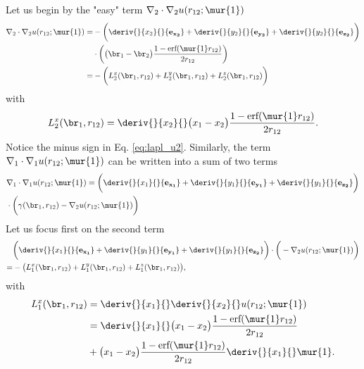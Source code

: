 Let us begin by the "easy" term $\nabla_2 \cdot \nabla_2 u(r_{12};\mur{1})$
\begin{equation}
 \begin{aligned}
 \label{eq:lapl_u2}
 \nabla_2 \cdot \nabla_2 u(r_{12};\mur{1}) =& -\bigg( \deriv{}{x_2}{} {\bf e_{x_2}}+ \deriv{}{y_2}{} {\bf e_{y_2}}+ \deriv{}{y_2}{} {\bf e_{z_2}} \bigg) \\ & \cdot \bigg(\big(\br_1 - \br_2 \big)\frac{1 - \text{erf}(\mur{1} r_{12})}{2 r_{12}}\bigg) \\
          =&-\bigg( L_2^x(\br_1, r_{12}) + L_2^y(\br_1, r_{12})  + L_2^z(\br_1, r_{12})\bigg)
 \end{aligned}
\end{equation}
with 
\begin{equation}
 L_2^x(\br_1, r_{12}) = \deriv{}{x_2}{} \big(x_1 - x_2 \big)\frac{1 - \text{erf}(\mur{1} r_{12})}{2 r_{12}}.
\end{equation}
Notice the minus sign in Eq. \eqref{eq:lapl_u2}. 
Similarly, the term $\nabla_1 \cdot \nabla_1 u(r_{12};\mur{1})$ can be written into a sum of two terms 
\begin{equation}
 \begin{aligned}
 &\nabla_1 \cdot \nabla_1 u(r_{12};\mur{1}) =  \bigg( \deriv{}{x_1}{} {\bf e_{x_1}}+ \deriv{}{y_1}{} {\bf e_{y_1}}+ \deriv{}{y_1}{} {\bf e_{z_2}} \bigg) \\ & \cdot \bigg( {\bf {\gamma}}(\br_1, r_{12}) - \nabla_2 u(r_{12};\mur{1}) \bigg) \\
 \end{aligned}
\end{equation}
Let us focus first on the second term 
\begin{equation}
 \begin{aligned}
 &\bigg( \deriv{}{x_1}{} {\bf e_{x_1}}+ \deriv{}{y_1}{} {\bf e_{y_1}}+ \deriv{}{y_1}{} {\bf e_{z_2}} \bigg)  \cdot \bigg( -\nabla_2 u(r_{12};\mur{1}) \bigg) \\
         = &  -\big(L_1^x(\br_1, r_{12}) + L_1^y(\br_1, r_{12})  + L_1^z(\br_1, r_{12}) \big) ,
 \end{aligned}
\end{equation}
with 
\begin{equation}
 \begin{aligned}
 L_1^x(\br_1, r_{12})& =  \deriv{}{x_1}{} \deriv{}{x_2}{} u(r_{12};\mur{1}) \\
                     & =  \deriv{}{x_1}{} \big(x_1 - x_2 \big)\frac{1 - \text{erf}(\mur{1} r_{12})}{2 r_{12}} \\ 
                     & + \big(x_1 - x_2 \big)\frac{1 - \text{erf}(\mur{1} r_{12})}{2 r_{12}} \deriv{}{x_1}{} \mur{1}.
 \end{aligned}
\end{equation}
